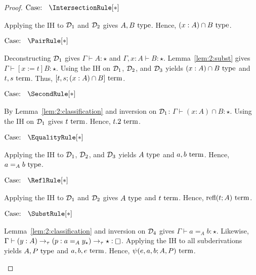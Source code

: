 \begin{proof}
    $\text{Case: }\begin{array}{c} \IntersectionRule[*] \end{array}$
    \begin{proofcase}
        Applying the IH to $\mathcal{D}_{1}$ and $\mathcal{D}_{2}$ gives $A, B~\textnormal{type}$.
        Hence, $(x : A) \cap B~\textnormal{type}$.
    \end{proofcase}

    $\text{Case: }\begin{array}{c} \PairRule[*] \end{array}$
    \begin{proofcase}
        Deconstructing $\mathcal{D}_{1}$ gives $\Gamma \vdash A : \star$ and $\Gamma, x : A \vdash B : \star$.
        Lemma~\ref{lem:2:subst} gives $\Gamma \vdash [x := t]B : \star$.
        Using the IH on $\mathcal{D}_{1}$, $\mathcal{D}_{2}$, and $\mathcal{D}_{3}$ yields $(x : A) \cap B~\textnormal{type}$ and $t, s~\textnormal{term}$.
        Thus, $[t, s; (x : A) \cap B]~\textnormal{term}$.
    \end{proofcase}

    $\text{Case: }\begin{array}{c} \SecondRule[*] \end{array}$
    \begin{proofcase}
        By Lemma~\ref{lem:2:classification} and inversion on $\mathcal{D}_{1}$: $\Gamma \vdash (x : A) \cap B : \star$.
        Using the IH on $\mathcal{D}_{1}$ gives $t~\textnormal{term}$.
        Hence, $t.2~\textnormal{term}$.
    \end{proofcase}

    $\text{Case: }\begin{array}{c} \EqualityRule[*] \end{array}$
    \begin{proofcase}
        Applying the IH to $\mathcal{D}_{1}$, $\mathcal{D}_{2}$, and $\mathcal{D}_{3}$ yields $A~\textnormal{type}$ and $a, b~\textnormal{term}$.
        Hence, $a =_A b~\textnormal{type}$.
    \end{proofcase}

    $\text{Case: }\begin{array}{c} \ReflRule[*] \end{array}$
    \begin{proofcase}
        Applying the IH to $\mathcal{D}_{1}$ and $\mathcal{D}_{2}$ gives $A~\textnormal{type}$ and $t~\textnormal{term}$.
        Hence, $\textnormal{refl}(t; A)~\textnormal{term}$.
    \end{proofcase}

    \begin{minipage}{.8\textwidth}$\text{Case: }\begin{array}{c} \SubstRule[*] \end{array}$\end{minipage}
    \begin{proofcase}
        Lemma~\ref{lem:2:classification} and inversion on $\mathcal{D}_{4}$ gives $\Gamma \vdash a =_A b : \star$.
        Likewise, $\Gamma \vdash (y : A) \to_\tau (p : a =_A y_\star) \to_\tau \star : \kind$.
        Applying the IH to all subderivations yields $A, P~\textnormal{type}$ and $a, b, e~\textnormal{term}$.
        Hence, $\psi(e, a, b; A, P)~\textnormal{term}$.
    \end{proofcase}


\end{proof}
